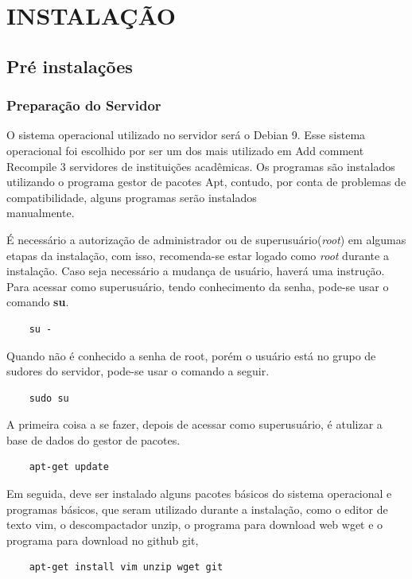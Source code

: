 \documentclass[12pt,hidelinks]{article}
\begin{document}
\section{INSTALAÇÃO}
\vspace{10.5cm}

    \subsection{Pré instalações}

        \subsubsection{Preparação do Servidor}
        
            \qquad O sistema operacional utilizado no servidor será o Debian 9. Esse sistema operacional foi escolhido por ser um dos mais utilizado em 
 Add comment
  Recompile
3
 servidores de instituições acadêmicas. Os programas são instalados utilizando o programa gestor de pacotes Apt, contudo, por conta de problemas de compatibilidade, alguns programas serão instalados \\manualmente.
            
            É necessário a autorização de administrador ou de superusuário(\textit{root}) em algumas etapas da instalação, com isso, recomenda-se estar logado como \textit{root} durante a instalação. Caso seja necessário a mudança de usuário, haverá uma instrução. Para acessar como superusuário, tendo conhecimento da senha, pode-se usar o comando \textbf{su}.
            \begin{verbatim}
    su -
            \end{verbatim}
            Quando não é conhecido a senha de root, porém o usuário está no grupo de sudores do servidor, pode-se usar o comando a seguir.
            \begin{verbatim}
    sudo su
            \end{verbatim}
            
            A primeira coisa a se fazer, depois de acessar como superusuário, é atulizar a base de dados do gestor de pacotes.

            \begin{verbatim}
    apt-get update
            \end{verbatim}
\newpage
            Em seguida, deve ser instalado alguns pacotes básicos do sistema operacional e programas básicos, que seram utilizado durante a instalação, como o editor de texto vim, o descompactador unzip, o programa para download web wget e o programa para download no github git,
            \begin{verbatim}
    apt-get install vim unzip wget git
            \end{verbatim}
            
\end{document}

